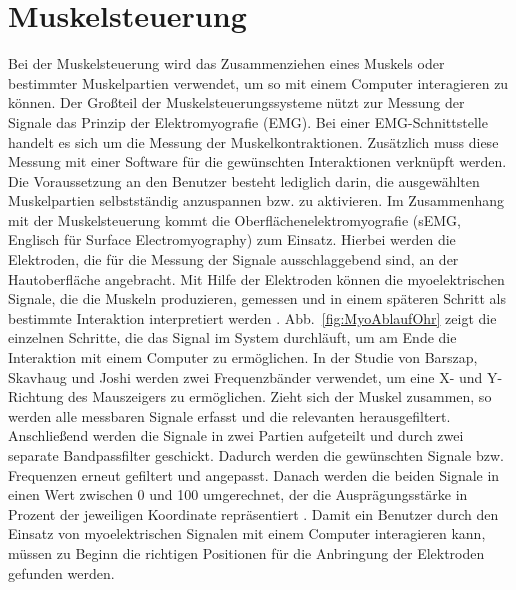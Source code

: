 \section{Muskelsteuerung}

Bei der Muskelsteuerung wird das Zusammenziehen eines Muskels oder bestimmter Muskelpartien verwendet, um so mit einem Computer interagieren zu können.
\newline \newline
Der Großteil der Muskelsteuerungssysteme nützt zur Messung der Signale das Prinzip der Elektromyografie (EMG). Bei einer EMG-Schnittstelle handelt es sich um die Messung der Muskelkontraktionen. Zusätzlich muss diese Messung mit einer Software für die gewünschten Interaktionen verknüpft werden. Die Voraussetzung an den Benutzer besteht lediglich darin, die ausgewählten Muskelpartien selbstständig anzuspannen bzw. zu aktivieren. Im Zusammenhang mit der Muskelsteuerung kommt die \mbox{Oberflächenelektromyografie} (sEMG, Englisch für Surface Electromyography) zum Einsatz. Hierbei werden die Elektroden, die für die Messung der Signale ausschlaggebend sind, an der Hautoberfläche angebracht. Mit Hilfe der Elektroden können die myoelektrischen Signale, die die Muskeln produzieren, gemessen und in einem späteren Schritt als bestimmte Interaktion interpretiert werden \cite{EmgDefinition}.
\newline \newline
Abb.~\ref{fig:MyoAblaufOhr} zeigt die einzelnen Schritte, die das Signal im System durchläuft, um am Ende die Interaktion mit einem Computer zu ermöglichen. In der Studie von Barszap, Skavhaug und Joshi \cite{MyoOhr} werden zwei Frequenzbänder verwendet, um eine X- und Y- Richtung des Mauszeigers zu ermöglichen. Zieht sich der Muskel zusammen, so werden alle messbaren Signale erfasst und die relevanten herausgefiltert. Anschließend werden die Signale in zwei Partien aufgeteilt und durch zwei separate Bandpassfilter geschickt. \newline
Dadurch werden die gewünschten Signale bzw. Frequenzen erneut gefiltert und angepasst. Danach werden die beiden Signale in einen Wert zwischen 0 und 100 umgerechnet, der die Ausprägungsstärke in Prozent der jeweiligen Koordinate repräsentiert \cite{MyoOhr}.
\newline \newline
Damit ein Benutzer durch den Einsatz von myoelektrischen Signalen mit einem Computer interagieren kann, müssen zu Beginn die richtigen Positionen für die Anbringung der Elektroden gefunden werden.  
